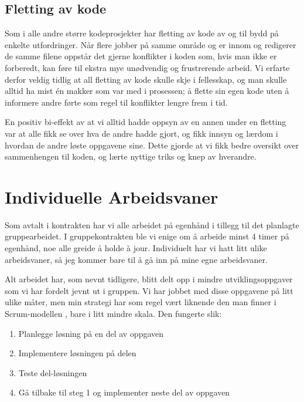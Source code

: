 \documentclass[a4paper, 12pt]{article}  %
\begin{document}
\subsection{Fletting av kode}

Som i alle andre større kodeprosjekter har fletting av kode av og til bydd på enkelte utfordringer.
Når flere jobber på samme område og er innom og redigerer de samme filene oppstår det gjerne konflikter i koden som, hvis man ikke er forberedt, kan føre til ekstra mye unødvendig og frustrerende arbeid.
Vi erfarte derfor veldig tidlig at all fletting av kode skulle skje i fellesskap, og man skulle alltid ha mist én makker som var med i prosessen; å flette sin egen kode uten å informere andre førte som regel til konflikter lengre frem i tid.

En positiv bi-effekt av at vi alltid hadde oppsyn av en annen under en fletting var at alle fikk se over hva de andre hadde gjort, og fikk innsyn og lærdom i hvordan de andre løste oppgavene sine.
Dette gjorde at vi fikk bedre oversikt over sammenhengen til koden, og lærte nyttige triks og knep av hverandre.

\section{Individuelle Arbeidsvaner}

Som avtalt i kontrakten har vi alle arbeidet på egenhånd i tillegg til det planlagte gruppearbeidet.
I gruppekontrakten ble vi enige om å arbeide minst 4 timer på egenhånd, noe alle greide å holde à jour.
Individuelt har vi hatt litt ulike arbeidsvaner, så jeg kommer bare til å gå inn på mine egne arbeidsvaner.

Alt arbeidet har, som nevnt tidligere, blitt delt opp i mindre utviklingsoppgaver som vi har fordelt jevnt ut i gruppen.
Vi har jobbet med disse oppgavene på litt ulike måter, men min strategi har som regel vært liknende den man finner i Scrum-modellen \cite{scrum}, bare i litt mindre skala. Den fungerte slik:

\begin{enumerate}
    \item Planlegge løsning på en del av oppgaven
    \item Implementere løsningen på delen
    \item Teste del-løsningen
    \item Gå tilbake til steg 1 og implementer neste del av oppgaven
\end{enumerate}
\end{document}
